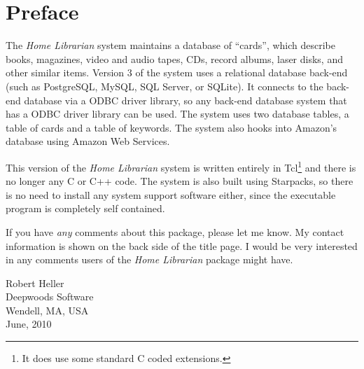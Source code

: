 \chapter*{Preface}
%


The {\em Home Librarian} system maintains a database of ``cards'',
which describe books, magazines, video and audio tapes, CDs, record
albums, laser disks, and other similar items. Version 3 of the system
uses a relational database back-end (such as PostgreSQL, MySQL, SQL
Server, or SQLite). It connects to the back-end database via a ODBC
driver library, so any back-end database system that has a ODBC driver
library can be used.  The system uses two database tables, a table of
cards and a table of keywords.  The system also hooks into Amazon's
database using Amazon Web Services.

This version of the {\em Home Librarian} system is
written entirely in Tcl\footnote{It does use some standard C coded
extensions.} and there is no longer any C or C++ code. The system is
also built using Starpacks, so there is no need to install any system
support software either, since the executable program is completely
self contained.

If you have {\em any} comments about this package, please let me know.
My contact information is shown on the back side of the title page.
I would be very interested in any comments users of the {\em Home
Librarian} package might have.

\vspace{.25in}
\noindent
Robert Heller \\
Deepwoods Software \\
Wendell, MA, USA \\
June, 2010

